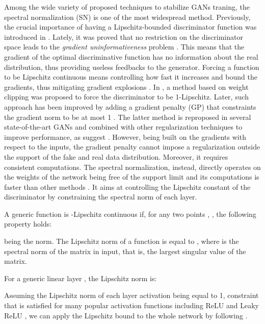 \documentclass[graybox]{svmult}
\begin{document}
\noindent Among the wide variety of proposed techniques to stabilize GANs traning, the spectral normalization (SN) \cite{Miyato2018SpectralNF} is one of the most widespread method. Previously, the crucial importance of having a Lipschitz-bounded discriminator function was introduced in \cite{Arjovsky2017WassersteinG, GulrajaniNIPS2017}. Lately, it was proved that no restriction on the discriminator space leads to the \textit{gradient uninformativeness} problem \cite{ZhouLipGan2019}. This means that the gradient of the optimal discriminative function has no information about the real distribution, thus providing useless feedbacks to the generator. Forcing a function to be Lipschitz continuous means controlling how fast it increases and bound the gradients, thus mitigating gradient explosions \cite{ZhouLipGan2019, GoukLipNN2021}. In \cite{Arjovsky2017WassersteinG}, a method based on weight clipping was proposed to force the discriminator to be 1-Lipschitz. Later, such approach has been improved by adding a gradient penalty (GP) that constraints the gradient norm to be at most 1 \cite{GulrajaniNIPS2017}. The latter method is reproposed in several state-of-the-art GANs and combined with other regularization techniques to improve performance, as suggest \cite{Kurach2019ALS}. However, being built on the gradients with respect to the inputs, the gradient penalty cannot impose a regularization outside the support of the fake and real data distribution. Moreover, it requires consistent computations. The spectral normalization, instead, directly operates on the weights of the network being free of the support limit and its computations is faster than other methods \cite{Miyato2018SpectralNF}. It aims at controlling the Lipschitz constant of the discriminator by constraining the spectral norm of each layer.

A generic function  is -Lipschitz continuous if, for any two points , , the following property holds:



\noindent being  the  norm.
The Lipschitz norm  of a function  is equal to , where  is the spectral norm of the matrix in input, that is, the largest singular value of the matrix.

For a generic linear layer , the Lipschitz norm is:



\noindent Assuming the Lipschitz norm of each layer activation being equal to 1, constraint that is satisfied for many popular activation functions including ReLU and Leaky ReLU \cite{Miyato2018SpectralNF}, we can apply the Lipschitz bound to the whole network by following .
\end{document}
